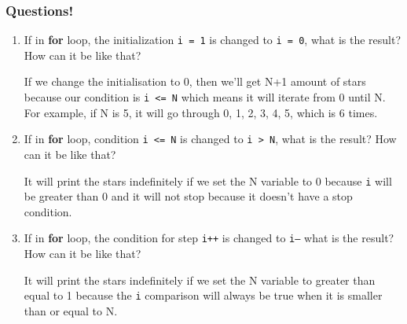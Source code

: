 \documentclass[12pt,titlepage]{article}
\begin{document}
\subsubsection*{Questions!}
\begin{enumerate}
    \item{
        If in \textbf{for} loop, the initialization \texttt{i = 1} is changed to \texttt{i = 0}, what is the result? How can it be like that?
        
        If we change the initialisation to 0, then we'll get N+1 amount of stars because our condition is \texttt{i <= N} which means it will iterate
        from 0 until N. For example, if N is 5, it will go through 0, 1, 2, 3, 4, 5, which is 6 times.
    }
    \item{
        If in \textbf{for} loop, condition \texttt{i <= N} is changed to \texttt{i > N}, what is the result? How can it be like that?

        It will print the stars indefinitely if we set the N variable to 0 because \texttt{i} will be greater than 0 and it will not stop because it doesn't have a stop condition.
    }
    \item{
        If in \textbf{for} loop, the condition for step \texttt{i++} is changed to \texttt{i--} what is the result? How can it be like that?

        It will print the stars indefinitely if we set the N variable to greater than equal to 1 because the \texttt{i} comparison will always be true when it is smaller than or equal to N.
    }
\end{enumerate}
\end{document}
